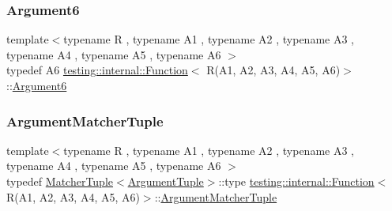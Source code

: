 \subsubsection{\texorpdfstring{Argument6}{Argument6}}
{\footnotesize\ttfamily template$<$typename R , typename A1 , typename A2 , typename A3 , typename A4 , typename A5 , typename A6 $>$ \\
typedef A6 \mbox{\hyperlink{structtesting_1_1internal_1_1Function}{testing\+::internal\+::\+Function}}$<$ R(A1, A2, A3, A4, A5, A6)$>$\+::\mbox{\hyperlink{structtesting_1_1internal_1_1Function_3_01R_07A1_00_01A2_00_01A3_00_01A4_00_01A5_00_01A6_08_4_ab69a06609b76f3b0ef780b9ecf0a940c}{Argument6}}}

\mbox{\label{structtesting_1_1internal_1_1Function_3_01R_07A1_00_01A2_00_01A3_00_01A4_00_01A5_00_01A6_08_4_a8555cb8e68c1e64b91b6c50a7b5951bd}} 
\subsubsection{\texorpdfstring{ArgumentMatcherTuple}{ArgumentMatcherTuple}}
{\footnotesize\ttfamily template$<$typename R , typename A1 , typename A2 , typename A3 , typename A4 , typename A5 , typename A6 $>$ \\
typedef \mbox{\hyperlink{structtesting_1_1internal_1_1MatcherTuple}{Matcher\+Tuple}}$<$\mbox{\hyperlink{structtesting_1_1internal_1_1Function_3_01R_07_08_4_ad483c3128c470d8cdb55c3ac1c575c11}{Argument\+Tuple}}$>$\+::type \mbox{\hyperlink{structtesting_1_1internal_1_1Function}{testing\+::internal\+::\+Function}}$<$ R(A1, A2, A3, A4, A5, A6)$>$\+::\mbox{\hyperlink{structtesting_1_1internal_1_1Function_3_01R_07_08_4_a9bec5cf8937e8af99dedab2f40129fab}{Argument\+Matcher\+Tuple}}}

\mbox{\label{structtesting_1_1internal_1_1Function_3_01R_07A1_00_01A2_00_01A3_00_01A4_00_01A5_00_01A6_08_4_a3120b03652156e1475ce5892e1b5dd7a}} 
